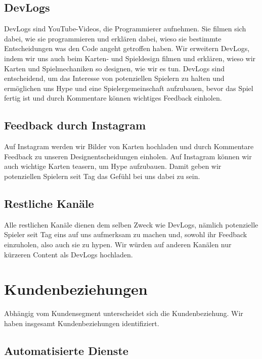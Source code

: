 \documentclass[fontsize=11, a4aper]{scrartcl}
\begin{document}
\subsection{DevLogs} \label{subsec:DevLogs}

DevLogs sind YouTube-Videos, die Programmierer aufnehmen. Sie filmen sich dabei, wie sie programmieren und erklären dabei, wieso sie bestimmte Entscheidungen was den Code angeht getroffen haben. Wir erweitern DevLogs, indem wir uns auch beim Karten- und Spieldesign filmen und erklären, wieso wir Karten und Spielmechaniken so designen, wie wir es tun. DevLogs sind entscheidend, um das Interesse von potenziellen Spielern zu halten und ermöglichen uns Hype und eine Spielergemeinschaft aufzubauen, bevor das Spiel fertig ist und durch Kommentare können wichtiges Feedback einholen.

\subsection{Feedback durch Instagram} \label{subsec:Feedback_durch_Instagram}

Auf Instagram werden wir Bilder von Karten hochladen und durch Kommentare Feedback zu unseren Designentscheidungen einholen. Auf Instagram können wir auch wichtige Karten teasern, um Hype aufzubauen. Damit geben wir potenziellen Spielern seit Tag das Gefühl bei uns dabei zu sein.

\subsection{Restliche Kanäle} \label{subsec:Restliche_Kanäle}

Alle restlichen Kanäle dienen dem selben Zweck wie DevLogs, nämlich potenzielle Spieler seit Tag eins auf uns aufmerksam zu machen und, sowohl ihr Feedback einzuholen, also auch sie zu hypen. Wir würden auf anderen Kanälen nur kürzeren Content als DevLogs hochladen.

\section{Kundenbeziehungen} \label{sec:Kundenbeziehungen}

Abhängig vom Kundensegment unterscheidet sich die Kundenbeziehung. Wir haben insgesamt Kundenbeziehungen identifiziert.

\subsection{Automatisierte Dienste} \label{subsec:Kundenbeziehungen:Automatisierte_Dienste}
\end{document}
